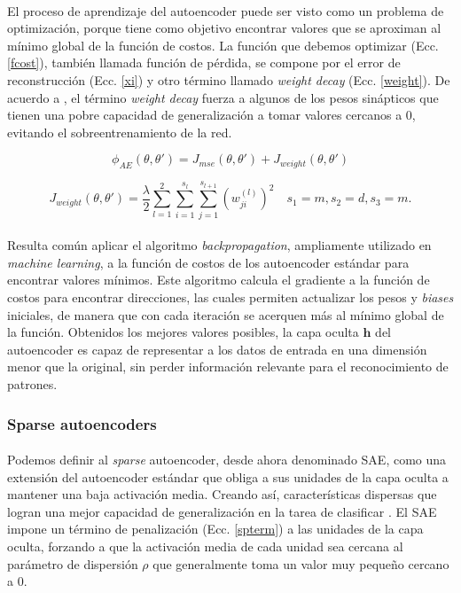 \documentclass[a4paper,12pt]{article}
\begin{document}
\paragraph{}
El proceso de aprendizaje del autoencoder puede ser visto como un problema de optimización, porque tiene como objetivo encontrar valores que se aproximan al mínimo global de la función de costos. La función que debemos optimizar (Ecc. \ref{fcost}), también llamada función de pérdida, se compone por el error de reconstrucción (Ecc. \ref{xi}) y otro término llamado \textit{weight decay} (Ecc. \ref{weight}). De acuerdo a \cite{haykin}, el término \textit{weight decay} fuerza a algunos de los pesos sinápticos que tienen una pobre capacidad de generalización a tomar valores cercanos a 0,  evitando el sobreentrenamiento de la red.

\begin{equation}
\label{fcost}
\phi_{AE}(\theta,\theta')= J_{mse}(\theta,\theta') + J_{weight}(\theta,\theta')
\end{equation} 

\begin{equation}
\label{weight}
J_{weight}(\theta,\theta')=\frac{\lambda}{2}\sum_{l=1}^{2}\sum_{i=1}^{s_l}\sum_{j=1}^{s_{l+1}}({w^{(l)}_{ji}})^2 \quad s_{1}=m,s_{2}=d,s_{3}=m.
\end{equation}

\paragraph{}
Resulta común aplicar el algoritmo \textit{backpropagation}, ampliamente utilizado en \textit{machine learning}, a la función de costos de los autoencoder estándar para encontrar valores mínimos. Este algoritmo calcula el gradiente a la función de costos para encontrar direcciones, las cuales permiten actualizar los pesos y \textit{biases} iniciales, de manera que con cada iteración se acerquen más al mínimo global de la función. Obtenidos los mejores valores posibles, la capa oculta $\textbf{h}$ del autoencoder es capaz de representar a los datos de entrada en una dimensión menor que la original, sin perder información relevante para el reconocimiento de patrones.

\subsubsection{Sparse autoencoders}

\paragraph{}
Podemos definir al \textit{sparse} autoencoder, desde ahora denominado SAE, como una extensión del autoencoder estándar que obliga a sus unidades de la capa oculta a mantener una baja activación media. Creando así, características dispersas que logran una mejor capacidad de generalización en la tarea de clasificar \cite{du}. El SAE impone un término de penalización (Ecc. \ref{spterm}) a las unidades de la capa oculta, forzando a que la activación media de cada unidad sea cercana al parámetro de dispersión $\rho$ que generalmente toma un valor muy pequeño cercano a 0. 
\end{document}
